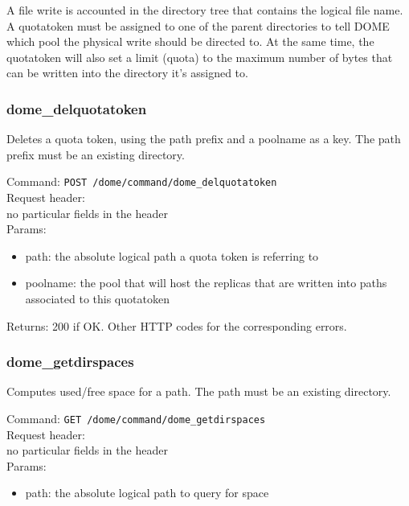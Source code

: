 \documentclass[a4paper,10pt]{scrreprt}
\begin{document}
A file write is accounted in the directory tree that contains the logical file name. A quotatoken must be assigned to one of the parent directories to tell DOME which pool the physical write should be directed to.
At the same time, the quotatoken will also set a limit (quota) to the maximum number of bytes that can be written into the directory it's assigned to.

\subsubsection{dome\_delquotatoken}
Deletes a quota token, using the path prefix and a poolname as a key. The path prefix must be an existing directory.

Command:
\lstinline"POST /dome/command/dome_delquotatoken"\\

Request header:\\
no particular fields in the header\\

Params:\\
\begin{itemize}
 \item path: the absolute logical path a quota token is referring to
 \item poolname: the pool that will host the replicas that are written into paths associated to this quotatoken
\end{itemize}

Returns: 200 if OK. Other HTTP codes for the corresponding errors.\\

\subsubsection{dome\_getdirspaces}
Computes used/free space for a path. The path must be an existing directory.

Command:
\lstinline"GET /dome/command/dome_getdirspaces"\\

Request header:\\
no particular fields in the header\\

Params:\\
\begin{itemize}
 \item path: the absolute logical path to query for space
\end{itemize}
\end{document}
